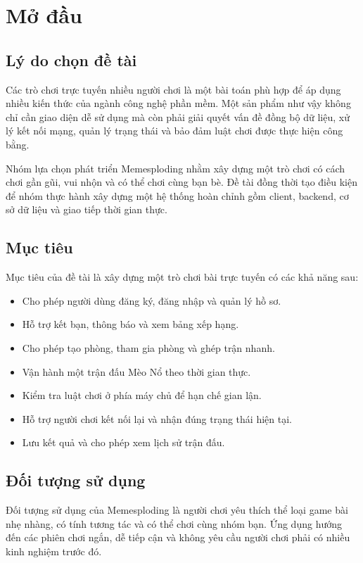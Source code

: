 \documentclass[a4paper]{report}
\begin{document}
\chapter{Mở đầu}

\section{Lý do chọn đề tài}

Các trò chơi trực tuyến nhiều người chơi là một bài toán phù hợp để áp dụng nhiều
kiến thức của ngành công nghệ phần mềm. Một sản phẩm như vậy không chỉ cần giao
diện dễ sử dụng mà còn phải giải quyết vấn đề đồng bộ dữ liệu, xử lý kết nối mạng,
quản lý trạng thái và bảo đảm luật chơi được thực hiện công bằng.

Nhóm lựa chọn phát triển Memesploding nhằm xây dựng một trò chơi có cách chơi
gần gũi, vui nhộn và có thể chơi cùng bạn bè. Đề tài đồng thời tạo điều kiện để
nhóm thực hành xây dựng một hệ thống hoàn chỉnh gồm client, backend, cơ sở dữ
liệu và giao tiếp thời gian thực.

\section{Mục tiêu}

Mục tiêu của đề tài là xây dựng một trò chơi bài trực tuyến có các khả năng sau:

\begin{itemize}
    \item Cho phép người dùng đăng ký, đăng nhập và quản lý hồ sơ.
    \item Hỗ trợ kết bạn, thông báo và xem bảng xếp hạng.
    \item Cho phép tạo phòng, tham gia phòng và ghép trận nhanh.
    \item Vận hành một trận đấu Mèo Nổ theo thời gian thực.
    \item Kiểm tra luật chơi ở phía máy chủ để hạn chế gian lận.
    \item Hỗ trợ người chơi kết nối lại và nhận đúng trạng thái hiện tại.
    \item Lưu kết quả và cho phép xem lịch sử trận đấu.
\end{itemize}

\section{Đối tượng sử dụng}

Đối tượng sử dụng của Memesploding là người chơi yêu thích thể loại game bài
nhẹ nhàng, có tính tương tác và có thể chơi cùng nhóm bạn. Ứng dụng hướng đến
các phiên chơi ngắn, dễ tiếp cận và không yêu cầu người chơi phải có nhiều kinh
nghiệm trước đó.
\end{document}

